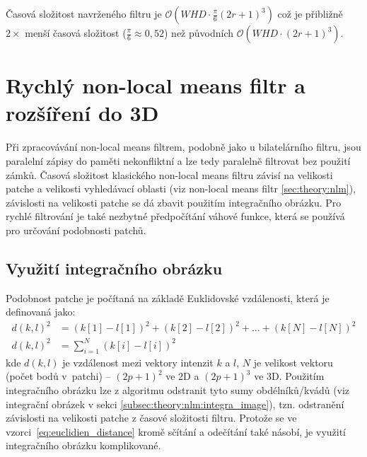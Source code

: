 Časová složitost navrženého filtru je $\mathcal{O}(WHD\cdot\frac{\pi}{6}(2r+1)^3)$ což je přibližně $2\times$ menší časová složitost ($\frac{\pi}{6}\approx0,52$) než původních $\mathcal{O}(WHD\cdot(2r+1)^3)$.

\newpage

\section{Rychlý non-local means filtr a rozšíření do 3D}
\label{sec:design:nlm}
Při zpracovávání non-local means filtrem, podobně jako u bilatelárního filtru, jsou paralelní zápisy do paměti nekonfliktní a lze tedy paralelně filtrovat bez použití zámků. Časová složitost klasického non-local means filtru závisí na velikosti patche a velikosti vyhledávací oblasti (viz non-local means filtr \ref{sec:theory:nlm}), závislosti na velikosti patche se dá zbavit použitím integračního obrázku. Pro rychlé filtrování je také nezbytné předpočítání váhové funkce, která se používá pro určování podobnosti patchů. 

\subsection*{Využití integračního obrázku}
Podobnost patche je počítaná na základě Euklidovské vzdálenosti, která je definovaná jako:
\begin{align}
    \label{eq:euclidien_distance}
    d(k,l)^2 &= (k[1] - l[1])^2 + (k[2] - l[2])^2 + \dots + (k[N] - l[N])^2 \\
    d(k,l)^2 &= \displaystyle\sum_{i=1}^N{(k[i] - l[i])^2}
\end{align}
kde $d(k,l)$ je  vzdálenost mezi vektory intenzit $k$ a $l$, $N$ je velikost vektoru (počet bodů v~patchi) -- $(2p + 1)^2$ ve 2D a $(2p + 1)^3$ ve 3D. Použitím integračního obrázku lze z algoritmu odstranit tyto sumy obdélníků/kvádů (viz integrační obrázek v sekci \ref{subsec:theory:nlm:integra_image}), tzn. odstranění závislosti na velikosti patche z časové složitosti filtru. Protože se ve vzorci~\ref{eq:euclidien_distance} kromě sčítání a odečítání také násobí, je využití integračního obrázku komplikované.

